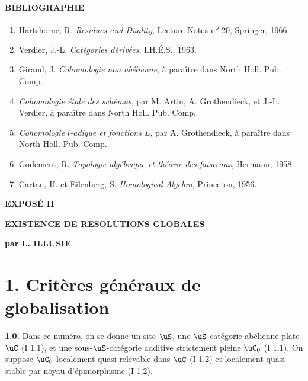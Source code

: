\bigskip

\centerline{\textbf{BIBLIOGRAPHIE}}

\begin{enumerate}
\item[{[H]}] Hartshorne, R. \textit{Residues and Duality}, Lecture Notes n\textsuperscript{o} 20, Springer, 1966.
\item[{[V]}] Verdier, J.-L. \textit{Cat\'{e}gories d\'{e}riv\'{e}es}, I.H.\'{E}.S., 1963.
\item[{[G]}] Giraud, J. \textit{Cohomologie non ab\'{e}lienne}, \`{a} para\^{i}tre dans North Holl. Pub. Comp.
\item[{[SGA 4]}] \textit{Cohomologie \'{e}tale des sch\'{e}mas}, par M. Artin, A. Grothendieck, et J.-L. Verdier, \`{a} para\^{i}tre dans North Holl. Pub. Comp.
\item[{[SGA 5]}] \textit{Cohomologie $l$-adique et fonctions $L$}, par A. Grothendieck, \`{a} para\^{i}tre dans North Holl. Pub. Comp.
\item[{[T.F]}] Godement, R. \textit{Topologie alg\'{e}brique et th\'{e}orie des faisceaux}, Hermann, 1958.
\item[{[C-E]}] Cartan, H. et Eilenberg, S. \textit{Homological Algebra}, Princeton, 1956.
\end{enumerate}

\newpage

\centerline{\textbf{\Large EXPOS\'{E} II}}
\vskip 0.3cm
\centerline{\textbf{\Large EXISTENCE DE RESOLUTIONS GLOBALES}}
\vskip 0.3cm
\centerline{\textbf{par L. ILLUSIE}}
\vskip 1cm

\section*{1. Crit\`{e}res g\'{e}n\'{e}raux de globalisation}

\noindent\textbf{1.0.} Dans ce num\'{e}ro, on se donne un site $\uS$, une $\uS$-cat\'{e}gorie ab\'{e}lienne plate $\uC$ (I 1.1), et une sous-$\uS$-cat\'{e}gorie additive strictement pleine $\uC_0$ (I 1.1). On suppose $\uC_0$ localement quasi-relevable dans $\uC$ (I 1.2) et localement quasi-stable par noyau d'\'{e}pimorphisme (I 1.2).

